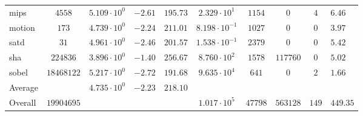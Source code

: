 \begin{tabular}{|l|c|HHc|c|c|c|cH|}
mips          & $ 4558     $ & $ 5.109 \cdot 10^{0} $ & $ -2.61 $ & $ 195.73 $ & $ 2.329 \cdot 10^{1}  $ & $ 1154  $ & $ 0      $ & $ 4   $ & $ 6.46    $ \\
motion        & $ 173      $ & $ 4.739 \cdot 10^{0} $ & $ -2.24 $ & $ 211.01 $ & $ 8.198 \cdot 10^{-1} $ & $ 1027  $ & $ 0      $ & $ 0   $ & $ 3.97    $ \\
satd          & $ 31       $ & $ 4.961 \cdot 10^{0} $ & $ -2.46 $ & $ 201.57 $ & $ 1.538 \cdot 10^{-1} $ & $ 2379  $ & $ 0      $ & $ 0   $ & $ 5.42    $ \\
sha           & $ 224836   $ & $ 3.896 \cdot 10^{0} $ & $ -1.40 $ & $ 256.67 $ & $ 8.760 \cdot 10^{2}  $ & $ 1578  $ & $ 117760 $ & $ 0   $ & $ 5.02    $ \\
sobel         & $ 18468122 $ & $ 5.217 \cdot 10^{0} $ & $ -2.72 $ & $ 191.68 $ & $ 9.635 \cdot 10^{4}  $ & $ 641   $ & $ 0      $ & $ 2   $ & $ 1.66    $ \\
\hline
Average       & $          $ & $ 4.735 \cdot 10^{0} $ & $ -2.23 $ & $ 218.10 $ & $                     $ & $       $ & $        $ & $     $ & $         $ \\
\hline
Overall       & $ 19904695 $ & $                    $ & $       $ & $        $ & $ 1.017 \cdot 10^{5}  $ & $ 47798 $ & $ 563128 $ & $ 149 $ & $ 449.35  $ \\
\hline
\end{tabular}
